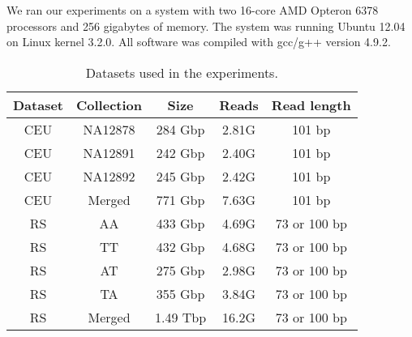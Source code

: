 \documentclass[smallabstract,smallcaptions]{dccpaper}
\newcommand{\CEU}{\textsf{CEU}}
\newcommand{\RS}{\textsf{RS}}
\begin{document}

We ran our experiments on a system with two 16\nobreakdash-core AMD Opteron 6378 processors and 256 gigabytes of memory. The system was running Ubuntu 12.04 on Linux kernel 3.2.0. All software was compiled with gcc/g++ version 4.9.2.

\begin{table}[t!]
\begin{center}
\caption{Datasets used in the experiments.}\label{table:datasets}\smallskip%
{
\renewcommand{\baselinestretch}{1}\footnotesize
\begin{tabular}{cc|ccc}
\hline
\textbf{Dataset} & \textbf{Collection} & \textbf{Size} & \textbf{Reads} & \textbf{Read length} \\
\hline
\CEU             & NA12878             &       284 Gbp &          2.81G &               101 bp \\
\CEU             & NA12891             &       242 Gbp &          2.40G &               101 bp \\
\CEU             & NA12892             &       245 Gbp &          2.42G &               101 bp \\
\CEU             & Merged              &       771 Gbp &          7.63G &               101 bp \\
\hline
\RS              & AA                  &       433 Gbp &          4.69G &         73 or 100 bp \\
\RS              & TT                  &       432 Gbp &          4.68G &         73 or 100 bp \\
\RS              & AT                  &       275 Gbp &          2.98G &         73 or 100 bp \\
\RS              & TA                  &       355 Gbp &          3.84G &         73 or 100 bp \\
\RS              & Merged              &      1.49 Tbp &          16.2G &         73 or 100 bp \\
\hline
\end{tabular}}
\end{center}
\end{table}
\end{document}
